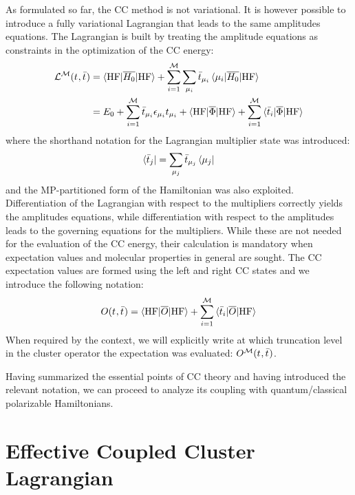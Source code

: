As formulated so far, the \acs{CC} method is not variational. It is
however possible to introduce a fully variational Lagrangian that
leads to the same amplitudes equations. The Lagrangian is built by
treating the amplitude equations as constraints in the optimization of
the \acs{CC} energy:
\begin{equation}\label{eq:cc-lagrangian}
  \begin{aligned}
    \mathcal{L}^\mathcal{M}(t_{}, \bar{t}_{})
    &=
    \braket{\mathrm{HF} | \overline{H_0} | \mathrm{HF}}
    + \sum_{i=1}^{\mathcal{M}}\sum_{\mu_i}
    \bar{t}_{\mu_i}\braket{\mu_i | \overline{H_0} | \mathrm{HF}} \\
    &=
  E_0
  + \sum_{i=1}^{\mathcal{M}}\bar{t}_{\mu_i}\epsilon_{\mu_i}t_{\mu_i}
  + \braket{\mathrm{HF} | \overline{\Phi} | \mathrm{HF}}
  + \sum_{i=1}^{\mathcal{M}}\braket{\bar{t}_{i} | \overline{\Phi} | \mathrm{HF}}
  \end{aligned}
\end{equation}
where the shorthand notation for the Lagrangian multiplier state was
introduced:
\begin{equation}
  \bra{\bar{t}_{j}} = \sum_{\mu_j}\bar{t}_{\mu_j}\bra{\mu_j}
\end{equation}
and the \acs{MP}-partitioned form of the Hamiltonian was also exploited.
Differentiation of the Lagrangian with respect to the multipliers
correctly yields the amplitudes equations, while differentiation with
respect to the amplitudes leads to the governing equations for the
multipliers. While these are not needed for the evaluation of the
\acs{CC} energy, their calculation is mandatory when expectation values
and molecular properties in general are sought.
The \acs{CC} expectation values are formed using the left and
right \acs{CC} states and we introduce the following notation:
\begin{equation}
  O(t_{}, \bar{t}_{}) = \braket{\mathrm{HF} | \overline{O} | \mathrm{HF} }
  + \sum_{i=1}^{\mathcal{M}}\braket{\bar{t}_{i} | \overline{O} | \mathrm{HF} }
\end{equation}
When required by the context, we will explicitly write at which
truncation level in the cluster operator the expectation was evaluated:
$O^\mathcal{M}(t_{}, \bar{t}_{})$.

Having summarized the essential points of \acs{CC} theory and having
introduced the relevant notation, we can proceed to analyze its coupling
with quantum/classical polarizable Hamiltonians.

\section{Effective Coupled Cluster Lagrangian}

